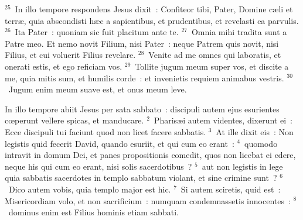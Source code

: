 ${}^{25}$~In illo tempore respondens Jesus dixit~: Confiteor tibi, Pater, Domine c\ae li et terr\ae , quia abscondisti h\ae c a sapientibus, et prudentibus, et revelasti ea parvulis.
${}^{26}$~Ita Pater~: quoniam sic fuit placitum ante te.
${}^{27}$~Omnia mihi tradita sunt a Patre meo. Et nemo novit Filium, nisi Pater~: neque Patrem quis novit, nisi Filius, et cui voluerit Filius revelare.
${}^{28}$~Venite ad me omnes qui laboratis, et onerati estis, et ego reficiam vos.
${}^{29}$~Tollite jugum meum super vos, et discite a me, quia mitis sum, et humilis corde~: et invenietis requiem animabus vestris.
${}^{30}$~Jugum enim meum suave est, et onus meum leve.

\lettrine[lines=10,image=true,loversize=0.05,lraise=-0.03]{I}{}n illo tempore abiit Jesus per sata sabbato~: discipuli autem ejus esurientes cœperunt vellere spicas, et manducare.
${}^{2}$~Pharis\ae i autem videntes, dixerunt ei~: Ecce discipuli tui faciunt quod non licet facere sabbatis.
${}^{3}$~At ille dixit eis~: Non legistis quid fecerit David, quando esuriit, et qui cum eo erant~:
${}^{4}$~quomodo intravit in domum Dei, et panes propositionis comedit, quos non licebat ei edere, neque his qui cum eo erant, nisi solis sacerdotibus~?
${}^{5}$~aut non legistis in lege quia sabbatis sacerdotes in templo sabbatum violant, et sine crimine sunt~?
${}^{6}$~Dico autem vobis, quia templo major est hic.
${}^{7}$~Si autem sciretis, quid est~: Misericordiam volo, et non sacrificium~: numquam condemnassetis innocentes~:
${}^{8}$~dominus enim est Filius hominis etiam sabbati.



